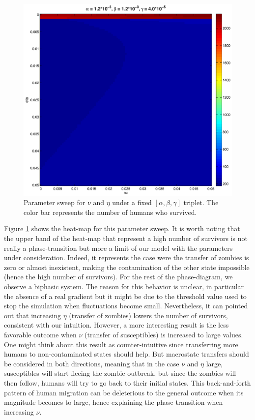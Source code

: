 \documentclass[11pt]{article} %
\begin{document}
\begin{figure}[h!]
\centerline{
\includegraphics[scale=0.33]{../images/Matlab_figures/nu-eta-sweep.eps}}
\caption{Parameter sweep for $\nu$ and $\eta$ under a fixed  $[\alpha, \beta, \gamma]$ triplet. The color bar represents the number of humans who survived.  \label{nueta} }
\end{figure}
Figure \ref{nueta} shows the heat-map for this parameter sweep. It is worth noting that the upper band of the heat-map that represent a high number of survivors is not really a phase-transition but more a limit of our model with the parameters under consideration. Indeed, it represents the case were the transfer of zombies is zero or almost inexistent, making the contamination of the other state impossible (hence the high number of survivors). For the rest of the phase-diagram, we observe a biphasic system. The reason for this behavior is unclear, in particular the absence of a real gradient but it might be due to the threshold value used to stop the simulation when fluctuations become small. Nevertheless, it can pointed out that increasing $\eta$ (transfer of zombies) lowers the number of survivors, consistent with our intuition. However, a more interesting result is the less favorable outcome when $\nu$ (transfer of susceptibles) is increased to large values. One might think about this result as counter-intuitive since transferring more humans to non-contaminated states should help. But macrostate transfers should be considered in both directions, meaning that in the case $\nu$ and $\eta$ large, susceptibles will start fleeing the zombie outbreak, but since the zombies will then follow, humans will try to go back to their initial states. This back-and-forth pattern of human migration can be deleterious to the general outcome when its magnitude becomes to large, hence explaining the phase transition when increasing $\nu$.
\end{document}
